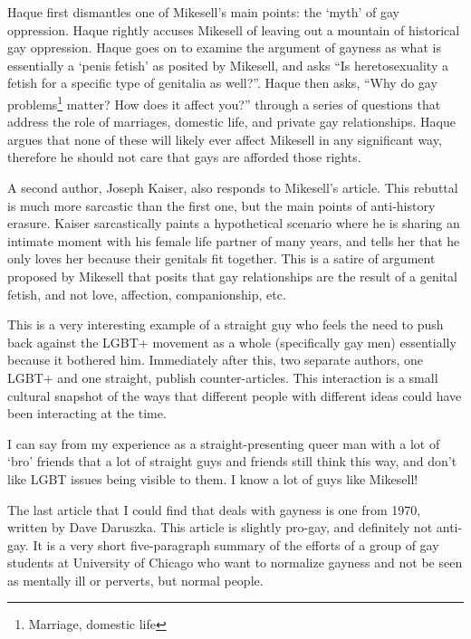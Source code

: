 \documentclass[a4paper,12pt]{article}
\begin{document}
	Haque first dismantles one of Mikesell's main points: the `myth' of gay oppression. Haque rightly accuses Mikesell of leaving out a mountain of historical gay oppression. Haque goes on to examine the argument of gayness as what is essentially a `penis fetish' as posited by Mikesell, and asks ``Is heretosexuality a fetish for a specific type of genitalia as well?''. Haque then asks, ``Why do gay problems\footnote{Marriage, domestic life} matter? How does it affect you?'' through a series of questions that address the role of marriages, domestic life, and private gay relationships. Haque argues that none of these will likely ever affect Mikesell in any significant way, therefore he should not care that gays are afforded those rights.
	
	A second author, Joseph Kaiser, also responds to Mikesell's article. \cite{counterantigay2} This rebuttal is much more sarcastic than the first one, but the main points of anti-history erasure. Kaiser sarcastically paints a hypothetical scenario where he is sharing an intimate moment with his female life partner of many years, and tells her that he only loves her because their genitals fit together. This is a satire of argument proposed by Mikesell that posits that gay relationships are the result of a genital fetish, and not love, affection, companionship, etc.

	This is a very interesting example of a straight guy who feels the need to push back against the LGBT+ movement as a whole (specifically gay men) essentially because it bothered him. Immediately after this, two separate authors, one LGBT+ and one straight, publish counter-articles. This interaction is a small cultural snapshot of the ways that different people with different ideas could have been interacting at the time. 
	
	I can say from my experience as a straight-presenting queer man with a lot of `bro' friends that a lot of straight guys and friends still think this way, and don't like LGBT issues being visible to them. I know a lot of guys like Mikesell!

	The last article that I could find that deals with gayness is one from 1970, written by Dave Daruszka.\cite{progayold} This article is slightly pro-gay, and definitely not anti-gay. It is a very short five-paragraph summary of the efforts of a group of gay students at University of Chicago who want to normalize gayness and not be seen as mentally ill or perverts, but normal people. 

\newpage
\singlespacing
\end{document}
